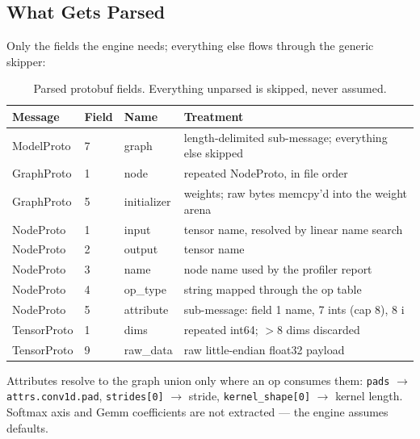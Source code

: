 \documentclass[11pt,a4paper]{article}
\begin{document}
\subsection{What Gets Parsed}

Only the fields the engine needs; everything else flows through the generic
skipper:

\begin{table}[h]
\centering
\small
\begin{tabularx}{\textwidth}{@{}lllX@{}}
\toprule
\textbf{Message} & \textbf{Field} & \textbf{Name} & \textbf{Treatment} \\
\midrule
ModelProto & 7 & graph & length-delimited sub-message; everything else skipped\\
GraphProto & 1 & node & repeated NodeProto, in file order\\
GraphProto & 5 & initializer & weights; raw bytes memcpy'd into the weight arena\\
NodeProto & 1 & input & tensor name, resolved by linear name search\\
NodeProto & 2 & output & tensor name\\
NodeProto & 3 & name & node name used by the profiler report\\
NodeProto & 4 & op\_type & string mapped through the op table\\
NodeProto & 5 & attribute & sub-message: field 1 name, 7 ints (cap 8), 8 i\\
TensorProto & 1 & dims & repeated int64; $>$8 dims discarded\\
TensorProto & 9 & raw\_data & raw little-endian float32 payload\\
\bottomrule
\end{tabularx}
\caption{Parsed protobuf fields. Everything unparsed is skipped, never assumed.}
\end{table}

Attributes resolve to the graph union only where an op consumes them:
\texttt{pads} $\rightarrow$ \texttt{attrs.conv1d.pad},
\texttt{strides[0]} $\rightarrow$ stride, \texttt{kernel\_shape[0]} $\rightarrow$
kernel length. Softmax axis and Gemm coefficients are not extracted --- the
engine assumes defaults.
\end{document}
